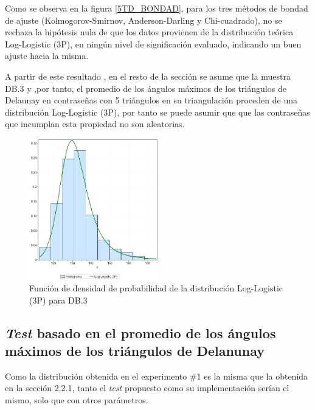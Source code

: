 \documentclass[12pt]{report}
\begin{document}
Como se observa en la figura  \ref{5TD_BONDAD}, para los tres métodos de bondad de ajuste (Kolmogorov-Smirnov, Anderson-Darling y Chi-cuadrado), no se rechaza la hipótesis nula de que los datos provienen de la distribución teórica Log-Logistic (3P), en ningún nivel de significación evaluado, indicando un buen ajuste hacia la misma.

A partir de este resultado , en el resto de la sección se asume que la muestra  DB.3 y ,por tanto, el promedio de los ángulos máximos de los triángulos de Delaunay en contraseñas con 5 triángulos en su triangulación  proceden de una distribución Log-Logistic (3P), por tanto se puede asumir que que las contraseñas que incumplan esta propiedad no son aleatorias.
\begin{figure}[ht]
	\centering
	
	\includegraphics[width=0.5\textwidth]{5td_fdp.png}
	\caption{Función de densidad de probabilidad de la  distribución Log-Logistic (3P) para DB.3}
	\label{5TD_FDP}
\end{figure}

\newpage
\subsection{\textit{Test} basado en el promedio de los ángulos máximos de los triángulos de Delanunay}
Como la distribución   obtenida en el experimento \#1 es la misma que la obtenida en la sección 2.2.1, tanto el \textit{test} propuesto como su implementación  serían el mismo, solo que con otros parámetros.

\end{document}
